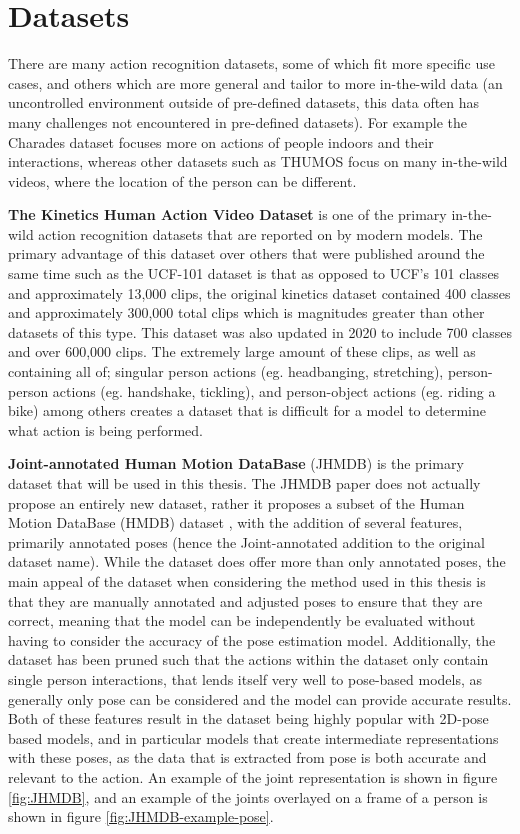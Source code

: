 \section{Datasets}
\label{sec:datasets}

There are many action recognition datasets, some of which fit more specific use cases, and others which are more general and tailor to more in-the-wild data (an uncontrolled environment outside of pre-defined datasets, this data often has many challenges not encountered in pre-defined datasets). For example the Charades dataset \cite{charades} focuses more on actions of people indoors and their interactions, whereas other datasets such as THUMOS \cite{THUMOS15} focus on many in-the-wild videos, where the location of the person can be different.

\textbf{The Kinetics Human Action Video Dataset} \cite{kinetics} is one of the primary in-the-wild action recognition datasets that are reported on by modern models. The primary advantage of this dataset over others that were published around the same time such as the UCF-101 dataset \cite{ucf101} is that as opposed to UCF's 101 classes and approximately 13,000 clips, the original kinetics dataset contained 400 classes and approximately 300,000 total clips which is magnitudes greater than other datasets of this type. This dataset was also updated in 2020 to include 700 classes and over 600,000 clips. The extremely large amount of these clips, as well as containing all of; singular person actions (eg. headbanging, stretching), person-person actions (eg. handshake, tickling), and person-object actions (eg. riding a bike) among others creates a dataset that is difficult for a model to determine what action is being performed.

\textbf{Joint-annotated Human Motion DataBase} (JHMDB) \cite{JHMDB} is the primary dataset that will be used in this thesis. The JHMDB paper does not actually propose an entirely new dataset, rather it proposes a subset of the Human Motion DataBase (HMDB) dataset \cite{hmdb}, with the addition of several features, primarily annotated poses (hence the Joint-annotated addition to the original dataset name). While the dataset does offer more than only annotated poses, the main appeal of the dataset when considering the method used in this thesis is that they are manually  annotated and adjusted poses to ensure that they are correct, meaning that the model can be independently be evaluated without having to consider the accuracy of the pose estimation model. Additionally, the dataset has been pruned such that the actions within the dataset only contain single person interactions, that lends itself very well to pose-based models, as generally only pose can be considered and the model can provide accurate results. Both of these features result in the dataset being highly popular with 2D-pose based models, and in particular models that create intermediate representations with these poses, as the data that is extracted from pose is both accurate and relevant to the action. An example of the joint representation is shown in figure \ref{fig:JHMDB}, and an example of the joints overlayed on a frame of a person is shown in figure \ref{fig:JHMDB-example-pose}.

